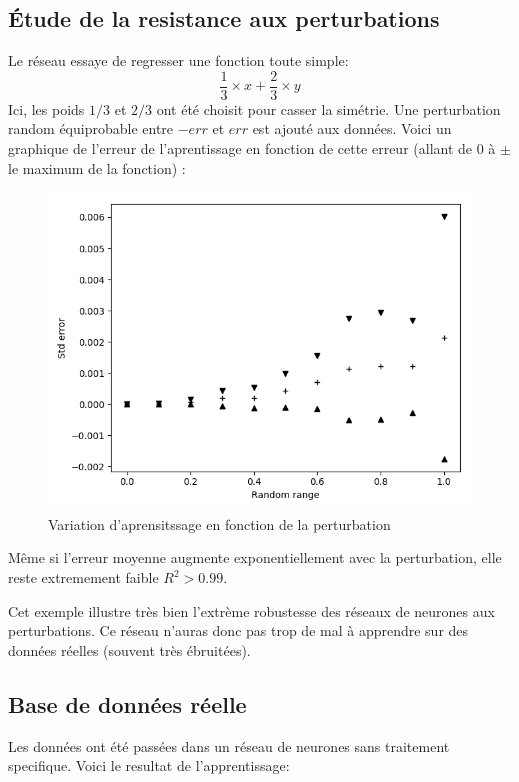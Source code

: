 \subsection{Étude de la resistance aux perturbations}\label{subsec:random}
Le réseau essaye de regresser une fonction toute simple:
\begin{equation}
    \frac{1}{3} \times x + \frac{2}{3} \times y
\end{equation}
Ici, les poids $1/3$ et $2/3$ ont été choisit pour casser la simétrie.
Une perturbation random équiprobable entre $-err$ et $err$ est ajouté aux données.
Voici un graphique de l'erreur de l'aprentissage en fonction de cette erreur
(allant de $0$ à $\pm$ le maximum de la fonction) :
\begin{figure}[H]
    \center
    \includegraphics[height=\moyen]{pict/random.png}
	\caption{Variation d'aprensitssage en fonction de la perturbation}
	\label{fig:obj2tiers1}
\end{figure}

Même si l'erreur moyenne augmente exponentiellement avec la perturbation,
elle reste extremement faible $R^2 > 0.99$.

Cet exemple illustre très bien l'extrème robustesse des réseaux de neurones aux perturbations.
Ce réseau n'auras donc pas trop de mal à apprendre sur des données réelles (souvent très ébruitées).

\subsection{Base de données réelle}\label{subsec:real}
Les données ont été passées dans un réseau de neurones sans traitement specifique.
Voici le resultat de l'apprentissage:

